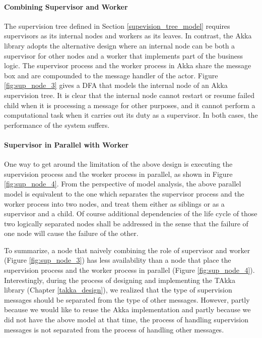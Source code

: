 \paragraph{Combining Supervisor and Worker}  

The supervision tree defined in Section \ref{supevision_tree_model} requires 
supervisors as its internal nodes and workers as its leaves.  In contrast, the 
Akka library adopts the alternative design where an internal node can be both a 
supervisor for other nodes and a worker that implements part of the business 
logic.  The supervisor process and the worker process in Akka share the message 
box and are compounded to the message handler of the actor.  Figure 
\ref{fig:sup_node_3} gives a DFA that models the internal node of an Akka 
supervision tree.  It is clear that the internal node cannot restart or resume 
failed child when it is processing a message for other purposes, and it cannot 
perform a computational task when it carries out its duty as a supervisor.  In 
both cases, the performance of the system suffers.

\paragraph{Supervisor in Parallel with Worker}  One way to get around the 
limitation of the above design is executing the supervision process and the 
worker process in parallel, as shown in Figure \ref{fig:sup_node_4}.  
From the perspective of model analysis, the above parallel model is equivalent 
to the one which separates the supervisor process and the worker process into 
two nodes, and treat them either as siblings or as a supervisor and a child.  
Of course additional dependencies of the life cycle of those two logically 
separated nodes shall be addressed in the sense that the failure of one node 
will cause the failure of the other.

\vspace{15 pt}

To summarize, a node that naively combining the role of supervisor and worker 
(Figure \ref{fig:sup_node_3}) has less availability than a node that place the 
supervision process and the worker process in parallel (Figure 
\ref{fig:sup_node_4}).  Interestingly, during the process of designing and 
implementing the TAkka library (Chapter \ref{takka_design}), we realized that 
the type of supervision messages should be separated 
from the type of other messages.  However, partly because we would like to 
reuse the Akka implementation and partly because we did not have the above 
model at that time, the process of handling supervision messages is not 
separated from the process of handling other messages.


